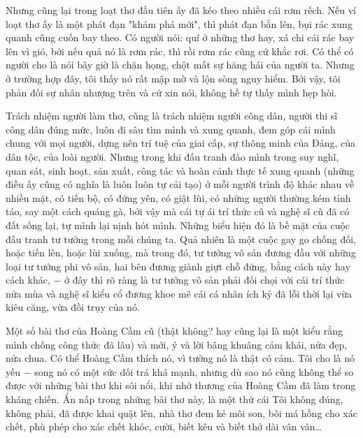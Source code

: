\documentclass[../main.tex]{subfiles}
\begin{document}
\begin{multicols}{2}
Nhưng cũng lại trong loạt thơ đầu tiên ấy đã kéo theo nhiều cái rơm rếch. Nếu ví loạt thơ ấy là một phát đạn "khám phá mới", thì phát đạn bắn lên, bụi rác xung quanh cũng cuốn bay theo. Có người nói: quí ở những thơ hay, xá chi cái rác bay lên vì gió, bởi nếu quả nó là rơm rác, thì rồi rơm rác cũng cứ khắc rơi. Có thể có người cho là nói bây giờ là chặn họng, chột mất sự hăng hái của người ta. Nhưng ở trường hợp đây, tôi thấy nó rất mập mờ và lộn sòng nguy hiểm. Bởi vậy, tôi phản đối sự nhân nhượng trên và cứ xin nói, không hề tự thấy mình hẹp hòi. 
 
Trách nhiệm người làm thơ, cũng là trách nhiệm người công dân, người thi sĩ công dân đúng mức, luôn đi sâu tìm mình và xung quanh, đem góp cái mình chung với mọi người, dựng nên trí tuệ của giai cấp, sự thông minh của Đảng, của dân tộc, của loài người. Nhưng trong khi đấu tranh đào mình trong suy nghĩ, quan sát, sinh hoạt, sản xuất, công tác và hoàn cảnh thực tế xung quanh (những điều ấy cũng có nghĩa là luôn luôn tự cải tạo) ở mỗi người trình độ khác nhau về nhiều mặt, có tiến bộ, có đứng yên, có giật lùi, có những người thường kém tỉnh táo, say một cách quáng gà, bởi vậy mà cái tự ái trí thức cũ và nghệ sĩ cũ đã có đất sống lại, tự mình lại nịnh hót mình. Những biểu hiện đó là bề mặt của cuộc đấu tranh tư tưởng trong mỗi chúng ta. Quả nhiên là một cuộc gay go chống đối, hoặc tiến lên, hoặc lùi xuống, mà trong đó, tư tưởng vô sản đương đầu với những loại tư tưởng phi vô sản, hai bên đương giành giựt chỗ đứng, bằng cách này hay cách khác, − ở đây thì rõ ràng là tư tưởng vô sản phải đối chọi với cái trí thức nửa mùa và nghệ sĩ kiểu cổ đương khoe mẽ cái cá nhân ích kỷ đã lỗi thời lại vừa kiêu căng, vừa đồi trụy của nó. 
 
Một số bài thơ của Hoàng Cầm cũ (thật không? hay cũng lại là một kiểu rằng mình chống công thức đã lâu) và mới, ý và lời bâng khuâng cảm khái, nửa đẹp, nửa chua. Có thể Hoàng Cầm thích nó, vì tưởng nó là thật có cảm. Tôi cho là nó yếu − song nó có một sức dối trá khá mạnh, nhưng dù sao nó cũng không thể so được với những bài thơ khi sôi nổi, khi nhớ thương của Hoàng Cầm đã làm trong kháng chiến. Ẩn nấp trong những bài thơ này, là một thứ cái Tôi không đúng, không phải, đã được khai quật lên, nhà thơ đem kẻ môi son, bôi má hồng cho xác chết, phù phép cho xác chết khóc, cười, biết kêu và biết thở dài vân vân… 
 

\end{multicols}
\end{document}
